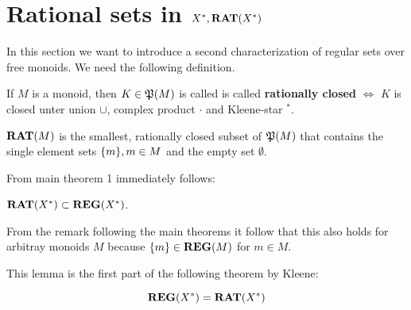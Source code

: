 \section{Rational sets in \texorpdfstring{$X^*, \mbox{{\bf RAT}}(X^*)$}{X*,
RAT(X*)}}

In this section we want to introduce a second characterization of regular sets
over free monoids. We need the following definition.

\begin{definition}
If $M$ is a monoid, then $K \in \mathfrak{P}({M})$ is called is called {\bf rationally
closed} $\Leftrightarrow$ $K$ is closed unter union $\cup$, complex product $\cdot$ and Kleene-star $^*$.
\end{definition}

\begin{definition}
$\mbox{{\bf RAT}}(M)$ is the smallest, rationally closed subset of $\mathfrak{P}({M})$ that
contains the single element sets $\mbox{$\{m\}$}, m \in M$ and the empty set
$\emptyset$.
\end{definition}

From main theorem 1 immediately follows:

\begin{lemma}
$\mbox{{\bf RAT}}(X^*) \subset \mbox{{\bf REG}}(X^*)$.
\end{lemma}

From the remark following the main theorems it follow that this also holds for
arbitray monoids $M$ because $\mbox{$\{m\}$} \in \mbox{{\bf REG}}(M)$ for $m \in M$.

This lemma is the first part of the following theorem by Kleene:

\begin{theorem}[Kleene]
\[ \mbox{{\bf REG}}(X^*) = \mbox{{\bf RAT}}(X^*) \]
\end{theorem}

